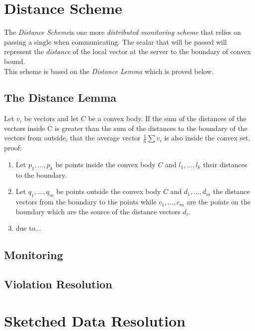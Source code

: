 \documentclass[10pt, conference]{IEEEtran}
\newcommand{\distanceScheme}{\textit{Distance Scheme}}
\begin{document}
\section{Distance Scheme}
The \distanceScheme is one more \textit{distributed monitoring scheme} that relies on passing a single when communicating. The scalar that will be passed will represent the \textit{distance} of the local vector at the server to the boundary of convex bound.\\
This scheme is based on the \textit{Distance Lemma} which is proved below.

\subsection{The Distance Lemma}
Let $v_i$ be vectors and let $C$ be a convex body. If the sum of the distances of the vectors inside C is greater than the sum of the distances to the boundary of the vectors from outside, that the average vector $\frac{1}{n}\sum {v_i}$ is also inside the convex set. \\
proof: \\
\begin{enumerate}
\item Let $p_1 ,..., p_k$ be points inside the convex body $C$ and $l_1 ,..., l_k$ their distances to the boundary.
\item Let $q_1 ,..., q_m$ be points outside the convex body $C$ and $d_1 ,..., d_m$ the distance vectors from the boundary to the points while $c_1 ,..., c_m$ are the points on the boundary which are the source of the distance vectors $d_i$.
\item due to...
\end{enumerate}
\subsection{Monitoring}

\subsection{Violation Resolution}

\section{Sketched Data Resolution}

\end{document}
